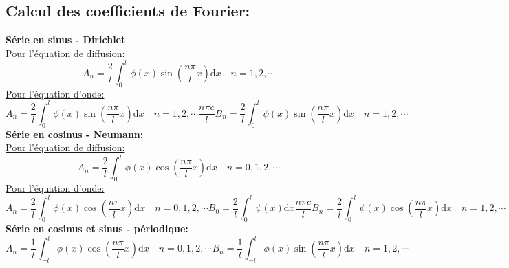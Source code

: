 \subsection*{Calcul des coefficients de Fourier:}
\textbf{Série en sinus - Dirichlet}\\
\underline{Pour l'équation de diffusion:}
\begin{equation*}
    \boxed{A_n=\frac{2}{l}\int_0^l\phi(x)\sin\left(\frac{n\pi}{l}x\right)\mathrm{d}x}\quad n=1,2,\cdots
\end{equation*}
\underline{Pour l'équation d'onde:}
\begin{subequations}
    \begin{equation*}
        \boxed{A_n=\frac{2}{l}\int_0^l\phi(x)\sin\left(\frac{n\pi}{l}x\right)\mathrm{d}x}\quad n=1,2,\cdots
    \end{equation*}
    \begin{equation*}
        \boxed{\frac{n\pi c}{l}B_n=\frac{2}{l}\int_0^l\psi(x)\sin\left(\frac{n\pi}{l}x\right)\mathrm{d}x}\quad n=1,2,\cdots
    \end{equation*}
\end{subequations}
\textbf{Série en cosinus - Neumann:}\\
\underline{Pour l'équation de diffusion:}
\begin{equation*}
    \boxed{A_n=\frac{2}{l}\int_0^l\phi(x)\cos\left(\frac{n\pi}{l}x\right)\mathrm{d}x}\quad n=0,1,2,\cdots
\end{equation*}
\underline{Pour l'équation d'onde:}
\begin{subequations}
    \begin{equation*}
        \boxed{A_n=\frac{2}{l}\int_0^l\phi(x)\cos\left(\frac{n\pi}{l}x\right)\mathrm{d}x}\quad n=0,1,2,\cdots
    \end{equation*}
    \begin{equation*}
        \boxed{B_0=\frac{2}{l}\int_0^l\psi(x)\mathrm{d}x}
    \end{equation*}
    \begin{equation*}
        \boxed{\frac{n\pi c}{l}B_n=\frac{2}{l}\int_0^l\psi(x)\cos\left(\frac{n\pi}{l}x\right)\mathrm{d}x}\quad n=1,2,\cdots
    \end{equation*}
\end{subequations}
\textbf{Série en cosinus et sinus - périodique:}
\begin{subequations}
    \begin{equation*}
        \boxed{A_n=\frac{1}{l}\int_{-l}^l\phi(x)\cos\left(\frac{n\pi}{l}x\right)\mathrm{d}x} \quad n=0,1,2,\cdots
    \end{equation*}
    \begin{equation*}
        \boxed{B_n=\frac{1}{l}\int_{-l}^l\phi(x)\sin\left(\frac{n\pi}{l}x\right)\mathrm{d}x} \quad n=1,2,\cdots
    \end{equation*}
\end{subequations}

